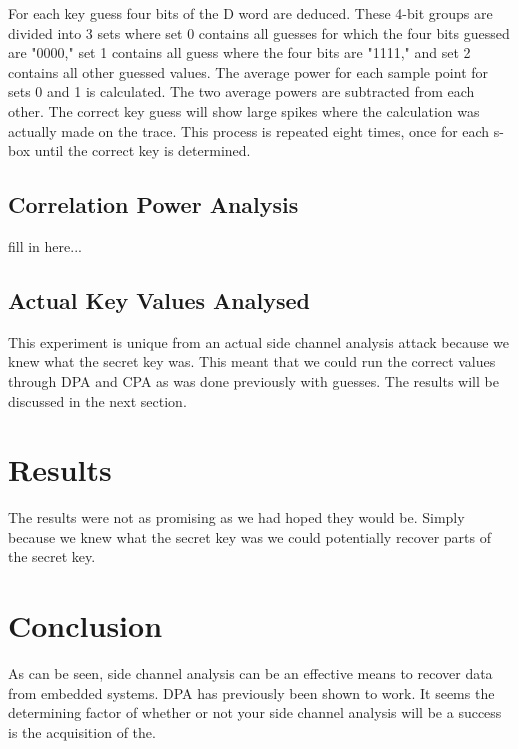 	For each key guess four bits of the D word are deduced.  These 4-bit groups are divided into 3 sets where set 0 contains all guesses for which the four bits guessed are "0000," set 1 contains all guess where the four bits are "1111," and set 2 contains all other guessed values.  The average power for each sample point for sets 0 and 1 is calculated.  The two average powers are subtracted from each other.  The correct key guess will show large spikes where the calculation was actually made on the trace.  This process is repeated eight times, once for each s-box until the correct key is determined.
	
\subsection{Correlation Power Analysis}
fill in here...

\subsection{Actual Key Values Analysed}
  This experiment is unique from an actual side channel analysis attack because we knew what the secret key was.  This meant that we could run the correct values through DPA and CPA as was done previously with guesses.  The results will be discussed in the next section.

\section{Results}\label{res}
  The results were not as promising as we had hoped they would be.  Simply because we knew what the secret key was we could potentially recover parts of the secret key.

\section{Conclusion}\label{sec::conclusion} 


	As can be seen, side channel analysis can be an effective means to recover data from embedded systems.  DPA has previously been shown to work.  It seems the determining factor of whether or not your side channel analysis will be a success is the acquisition of the.
\nocite{*}












